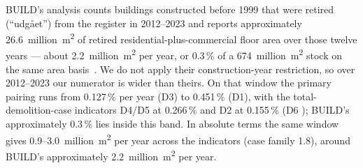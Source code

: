 BUILD's analysis counts buildings constructed before 1999 that were
retired (``udg{\aa}et'') from the register in 2012--2023 and reports
approximately 26.6~million~m\textsuperscript{2} of retired
residential-plus-commercial floor area over those twelve years --- about
2.2~million~m\textsuperscript{2} per year, or 0.3\,\% of a
674~million~m\textsuperscript{2} stock on the same area
basis~\cite{jensen2025nedrivning}. We do not apply their construction-year
restriction, so over 2012--2023 our numerator is wider than theirs. On
that window the primary pairing runs from 0.127\,\% per year (D3) to
0.451\,\% (D1), with the total-demolition-case indicators D4/D5 at
0.266\,\% and D2 at 0.155\,\% (D6 ); BUILD's
approximately 0.3\,\% lies inside this band. In absolute terms the same
window gives 0.9--3.0~million~m\textsuperscript{2} per year across the
indicators (case family 1.8), around BUILD's approximately
2.2~million~m\textsuperscript{2} per year.
